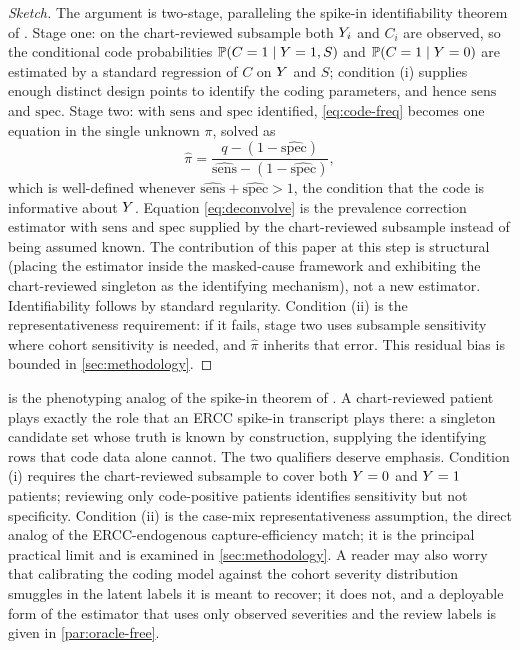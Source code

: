 \begin{proof}[Sketch]
The argument is two-stage, paralleling the spike-in identifiability
theorem of \citet{towell2026scrnacoarsening}. Stage one: on the
chart-reviewed subsample both $Y_i$ and $C_i$ are observed, so the
conditional code probabilities $\mathbb{P}(C = 1 \mid Y = 1, S)$ and
$\mathbb{P}(C = 1 \mid Y = 0)$ are estimated by a standard regression of
$C$ on $Y$ and $S$; condition (i) supplies enough distinct design
points to identify the coding parameters, and hence $\mathrm{sens}$ and
$\mathrm{spec}$. Stage two: with $\mathrm{sens}$ and $\mathrm{spec}$
identified, \eqref{eq:code-freq} becomes one equation in the single
unknown $\pi$, solved as
\begin{equation}
  \hat\pi
    = \frac{q - (1 - \widehat{\mathrm{spec}})}
            {\widehat{\mathrm{sens}} - (1 - \widehat{\mathrm{spec}})},
  \label{eq:deconvolve}
\end{equation}
which is well-defined whenever $\widehat{\mathrm{sens}} + \widehat{\mathrm{spec}}
> 1$, the condition that the code is informative about $Y$. Equation
\eqref{eq:deconvolve} is the \citet{rogan1978estimating} prevalence
correction estimator with $\mathrm{sens}$ and $\mathrm{spec}$ supplied
by the chart-reviewed subsample instead of being assumed known. The
contribution of this paper at this step is structural (placing the
estimator inside the masked-cause framework and exhibiting the
chart-reviewed singleton as the identifying mechanism), not a new
estimator. Identifiability follows by standard regularity. Condition (ii) is the
representativeness requirement: if it fails, stage two uses subsample
sensitivity where cohort sensitivity is needed, and $\hat\pi$ inherits
that error. This residual bias is bounded in \cref{sec:methodology}.
\end{proof}

 is the phenotyping analog of the
spike-in theorem of \citet{towell2026scrnacoarsening}. A chart-reviewed
patient plays exactly the role that an ERCC spike-in transcript plays
there: a singleton candidate set whose truth is known by construction,
supplying the identifying rows that code data alone cannot. The two
qualifiers deserve emphasis. Condition (i) requires the chart-reviewed
subsample to cover both $Y = 0$ and $Y = 1$ patients; reviewing only
code-positive patients identifies sensitivity but not specificity.
Condition (ii) is the case-mix representativeness assumption, the
direct analog of the ERCC-endogenous capture-efficiency match; it is
the principal practical limit and is examined in \cref{sec:methodology}.
A reader may also worry that calibrating the coding model against the
cohort severity distribution smuggles in the latent labels it is meant
to recover; it does not, and a deployable form of the estimator that
uses only observed severities and the review labels is given in
\cref{par:oracle-free}.


